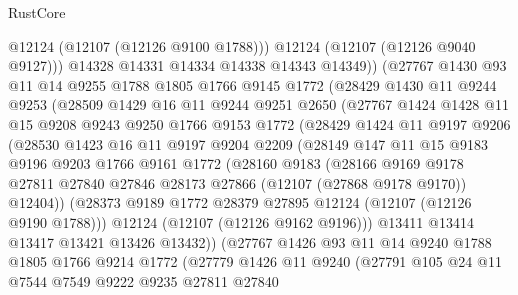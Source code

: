 \begin{lexlean}{RustCore}
\begin{coremodule}
              @12124
              (@12107 (@12126 @9100 @1788)))
            @12124
            (@12107 (@12126 @9040 @9127)))
          @14328
          @14331
          @14334
          @14338
          @14343
          @14349))
      (@27767
        @1430
        @93
        @11
        @14
        @9255
        @1788
        @1805
        @1766
        @9145
        @1772
        (@28429
          @1430
          @11
          @9244
          @9253
          (@28509
            @1429
            @16
            @11
            @9244
            @9251
            @2650
            (@27767
              @1424
              @1428
              @11
              @15
              @9208
              @9243
              @9250
              @1766
              @9153
              @1772
              (@28429
                @1424
                @11
                @9197
                @9206
                (@28530
                  @1423
                  @16
                  @11
                  @9197
                  @9204
                  @2209
                  (@28149
                    @147
                    @11
                    @15
                    @9183
                    @9196
                    @9203
                    @1766
                    @9161
                    @1772
                    (@28160
                      @9183
                      (@28166
                        @9169
                        @9178
                        @27811
                        @27840
                        @27846
                        @28173
                        @27866
                        (@12107 (@27868 @9178 @9170))
                        @12404))
                    (@28373 @9189 @1772 @28379 @27895 @12124 (@12107 (@12126 @9190 @1788)))
                    @12124
                    (@12107 (@12126 @9162 @9196)))
                  @13411
                  @13414
                  @13417
                  @13421
                  @13426
                  @13432))
              (@27767
                @1426
                @93
                @11
                @14
                @9240
                @1788
                @1805
                @1766
                @9214
                @1772
                (@27779
                  @1426
                  @11
                  @9240
                  (@27791
                    @105
                    @24
                    @11
                    @7544
                    @7549
                    @9222
                    @9235
                    @27811
                    @27840

\end{coremodule}
\end{lexlean}
